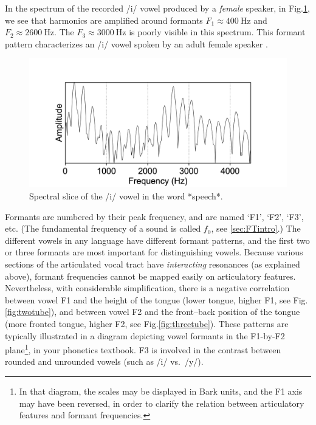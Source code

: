 \documentclass[
]{book}
\begin{document}
In the spectrum of the recorded /i/ vowel produced by a \emph{female} speaker, in Fig.\ref{fig:speech-spectralslice-i}, we see that harmonics are amplified around formants \(F_1 \approx 400\ \textrm{Hz}\) and \(F_2 \approx 2600\ \textrm{Hz}\). The \(F_3 \approx 3000\ \textrm{Hz}\) is poorly visible in this spectrum. This formant pattern characterizes an /i/ vowel spoken by an adult female speaker \citep[Table II]{Peterson_Barney_1952}.

\begin{figure}

{\centering \includegraphics{figures/speech_word_0_210_spectrum} 

}

\caption{Spectral slice of the /i/ vowel in the word *speech*.}\label{fig:speech-spectralslice-i}
\end{figure}

Formants are numbered by their peak frequency, and are named `F1', `F2', `F3', etc. (The fundamental frequency of a sound is called \(f_0\), see \ref{sec:FTintro}.)
The different vowels in any language have different formant patterns, and the first two or three formants are most important for distinguishing vowels. Because various sections of the articulated vocal tract have \emph{interacting} resonances (as explained above), formant frequencies cannot be mapped easily on articulatory features. Nevertheless, with considerable simplification, there is a negative correlation between vowel F1 and the height of the tongue (lower tongue, higher F1, see Fig.\ref{fig:twotube}), and between vowel F2 and the front--back position of the tongue (more fronted tongue, higher F2, see Fig.\ref{fig:threetube}). These patterns are typically illustrated in a diagram depicting vowel formants in the F1-by-F2 plane\footnote{In that diagram, the scales may be displayed in Bark units, and the F1 axis may have been reversed, in order to clarify the relation between articulatory features and formant frequencies.}, in your phonetics textbook. F3 is involved in the contrast between rounded and unrounded vowels (such as /i/ vs.~/y/).
\end{document}

